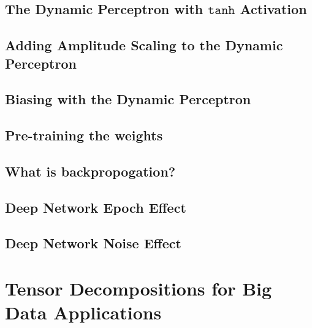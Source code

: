 \documentclass[12pt]{article}
\begin{document}
	\subsection{The Dynamic Perceptron with $\texttt{tanh}$ Activation} \label{sec: 4-2-dynamic-perc}
	\subsection{Adding Amplitude Scaling to the Dynamic Perceptron} \label{sec: 4-3-amplitude-dynamic-perc}
	\subsection{Biasing with the Dynamic Perceptron} \label{sec: 4-4-biasing-dynamic-perceptron}
	\subsection{Pre-training the weights} \label{sec: 4-5-weight-training-dynamic-perceptron}
	\subsection{What is backpropogation?} \label{sec: 4-6-backpropogation}
	\subsection{Deep Network Epoch Effect} \label{sec: 4-7-DL-epoch}
	\subsection{Deep Network Noise Effect} \label{sec: 4-7-DL-noise}
	
\section{Tensor Decompositions for Big Data Applications} \label{sec: 5-TD-BD}
	
\end{document}
